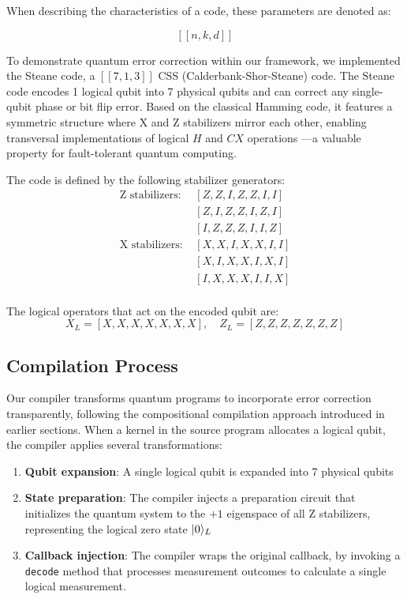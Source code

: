 When describing the characteristics of a code, these parameters are denoted as:

$$
[[n, k, d]]
$$


To demonstrate quantum error correction within our framework, we implemented the Steane code, a \([[7, 1, 3]]\) CSS (Calderbank-Shor-Steane) code. The Steane code encodes 1 logical qubit into 7 physical qubits and can correct any single-qubit phase or bit flip error. Based on the classical Hamming code, it features a symmetric structure where X and Z stabilizers mirror each other, enabling transversal implementations of logical $H$ and $CX$ operations ---a valuable property for fault-tolerant quantum computing.

The code is defined by the following stabilizer generators:~
\[
\begin{aligned}
\text{Z stabilizers: } &[Z, Z, I, Z, Z, I, I] \\
&[Z, I, Z, Z, I, Z, I] \\
&[I, Z, Z, Z, I, I, Z] \\
\text{X stabilizers: } &[X, X, I, X, X, I, I] \\
&[X, I, X, X, I, X, I] \\
&[I, X, X, X, I, I, X] \\
\end{aligned}
\]

The logical operators that act on the encoded qubit are:~
\[
X_L = [X, X, X, X, X, X, X], \quad
Z_L = [Z, Z, Z, Z, Z, Z, Z]
\]

\subsection{Compilation Process}

Our compiler transforms quantum programs to incorporate error correction transparently, following the compositional compilation approach introduced in earlier sections. When a kernel in the source program allocates a logical qubit, the compiler applies several transformations:

\begin{enumerate}
\item \textbf{Qubit expansion}: A single logical qubit is expanded into 7 physical qubits
\item \textbf{State preparation}: The compiler injects a preparation circuit that initializes the quantum system to the $+1$ eigenspace of all Z stabilizers, representing the logical zero state $|0\rangle_L$
\item \textbf{Callback injection}: The compiler wraps the original callback, by invoking a \texttt{decode} method that processes measurement outcomes to calculate a single logical measurement.
\end{enumerate}

